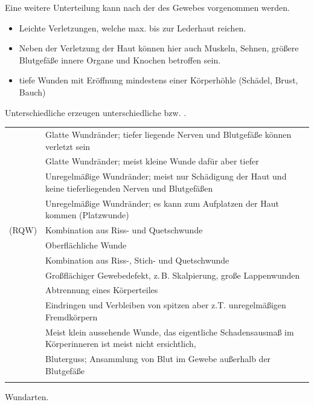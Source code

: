 Eine weitere Unterteilung kann nach der  des Gewebes vorgenommen werden.

\begin{itemize}
  \item {} Leichte Verletzungen,
  welche max. bis zur Lederhaut reichen.
  \item {} Neben der Verletzung der Haut
  können hier auch Muskeln, Sehnen, größere Blutgefäße innere Organe und Knochen betroffen sein.
  \item {} tiefe Wunden mit
  Eröffnung mindestens einer Körperhöhle (Schädel, Brust, Bauch)
\end{itemize}





Unterschiedliche  erzeugen
unterschiedliche  bzw. .

{

}{

}{
\begin{tabulary}{\linewidth}{LL}
\addlinespace
\noindent{}
&
Glatte Wundränder; tiefer liegende Nerven und Blutgefäße können verletzt sein
\\\addlinespace
\noindent{}
&
Glatte Wundränder; meist kleine Wunde dafür aber tiefer
\\\addlinespace
\noindent{}
&
Unregelmäßige Wundränder; meist nur Schädigung der Haut und
	keine tieferliegenden Nerven und Blutgefäßen
\\\addlinespace
\noindent{}
&
Unregelmäßige Wundränder; es kann zum Aufplatzen der Haut kommen (Platzwunde)
\\\addlinespace
\noindent{} (RQW)
&
Kombination aus Riss- und Quetschwunde
\\\addlinespace
\noindent{} 
&
Oberflächliche Wunde
\\\addlinespace
\noindent{} 
&
Kombination aus Riss-, Stich- und Quetschwunde
\\\addlinespace
\noindent{} 
&
Großflächiger Gewebedefekt, z.\,B. Skalpierung, große Lappenwunden
\\\addlinespace
\noindent{} 
&
Abtrennung eines Körperteiles
\\\addlinespace
\noindent{} 
&
Eindringen und Verbleiben von spitzen aber z.T. unregelmäßigen Fremdkörpern
\\\addlinespace
\noindent{} 
&
Meist klein aussehende Wunde, das eigentliche Schadensausmaß im Körperinneren
ist meist nicht ersichtlich, 
\\\addlinespace
\noindent{} 
&
Bluterguss; Ansammlung von Blut im Gewebe außerhalb der Blutgefäße 
\\\addlinespace\bottomrule
\end{tabulary}
}{Wundarten.}{}


